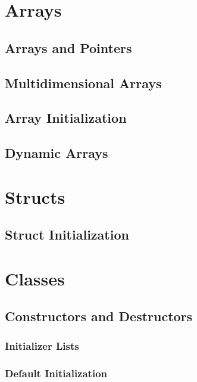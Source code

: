 \documentclass{article}
\title{\thistitle}
\author{\me}
\date{\today}
\begin{document}
\maketitle
\tableofcontents
\pagebreak

\section{Arrays}

\subsection{Arrays and Pointers}

\subsection{Multidimensional Arrays}

\subsection{Array Initialization}

\subsection{Dynamic Arrays}

\section{Structs}

\subsection{Struct Initialization}

\section{Classes}

\subsection{Constructors and Destructors}

\subsubsection{Initializer Lists}

\subsubsection{Default Initialization}
\end{document}
